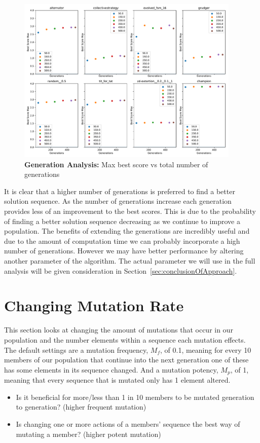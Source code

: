 \begin{figure}[ht] 
    \includegraphics[width=0.95\textwidth, keepaspectratio, center]{./img/plots/GENS_max_bs_v_gens_all.pdf}
\caption{\textbf{Generation Analysis:} Max best score vs total number of generations}\label{fig:GENS-max-bs-v-gens-all}
\end{figure}

It is clear that a higher number of generations is preferred to find a better solution sequence.
As the number of generations increase each generation provides less of an improvement to the best scores.
This is due to the probability of finding a better solution sequence decreasing as we continue to improve a population.
The benefits of extending the generations are incredibly useful and due to the amount of computation time we can probably incorporate a high number of generations. 
However we may have better performance by altering another parameter of the algorithm.
The actual parameter we will use in the full analysis will be given consideration in Section~\ref{sec:conclusionOfApproach}.

\section{Changing Mutation Rate}\label{sec:changeingmutationrate}
This section looks at changing the amount of mutations that occur in our population and the number elements within a sequence each mutation effects. 
The default settings are a mutation frequency, $M_f$, of 0.1, meaning for every 10 members of our population that continue into the next generation one of these has some elements in its sequence changed.
And a mutation potency, $M_p$, of 1, meaning that every sequence that is mutated only has 1 element altered.
\begin{itemize}
    \item Is it beneficial for more/less than 1 in 10 members to be mutated generation to generation? (higher frequent mutation)
    \item Is changing one or more actions of a members' sequence the best way of mutating a member? (higher potent mutation)
\end{itemize}

